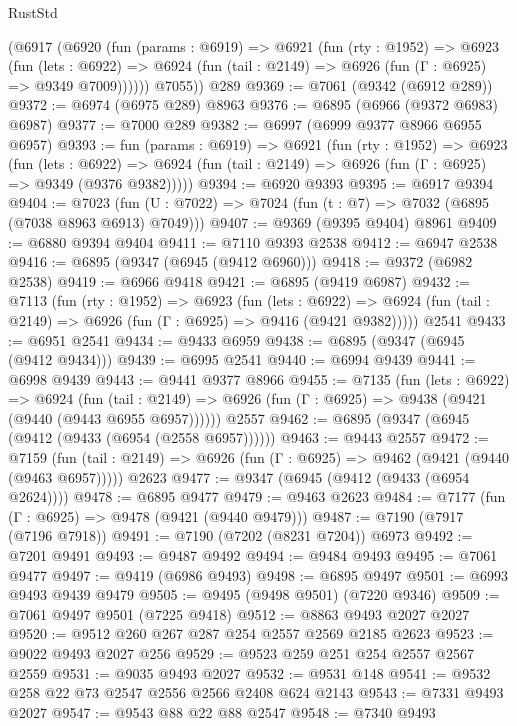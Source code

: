 \begin{lexlean}{RustStd}
\begin{coremodule}
      (@6917
        (@6920
          (fun (params : @6919) =>
          @6921
            (fun (rty : @1952) =>
            @6923
              (fun (lets : @6922) =>
              @6924 (fun (tail : @2149) => @6926 (fun (Γ : @6925) => @9349 @7009))))))
        @7055))
    @289
@9369 := @7061 (@9342 (@6912 @289))
@9372 := @6974 (@6975 @289) @8963
@9376 := @6895 (@6966 (@9372 @6983) @6987)
@9377 := @7000 @289
@9382 := @6997 (@6999 @9377 @8966 @6955 @6957)
@9393 := fun (params : @6919) =>
  @6921
    (fun (rty : @1952) =>
    @6923
      (fun (lets : @6922) =>
      @6924 (fun (tail : @2149) => @6926 (fun (Γ : @6925) => @9349 (@9376 @9382)))))
@9394 := @6920 @9393
@9395 := @6917 @9394
@9404 := @7023 (fun (U : @7022) => @7024 (fun (t : @7) => @7032 (@6895 (@7038 @8963 @6913) @7049)))
@9407 := @9369 (@9395 @9404) @8961
@9409 := @6880 @9394 @9404
@9411 := @7110 @9393 @2538
@9412 := @6947 @2538
@9416 := @6895 (@9347 (@6945 (@9412 @6960)))
@9418 := @9372 (@6982 @2538)
@9419 := @6966 @9418
@9421 := @6895 (@9419 @6987)
@9432 := @7113
    (fun (rty : @1952) =>
    @6923
      (fun (lets : @6922) =>
      @6924 (fun (tail : @2149) => @6926 (fun (Γ : @6925) => @9416 (@9421 @9382)))))
    @2541
@9433 := @6951 @2541
@9434 := @9433 @6959
@9438 := @6895 (@9347 (@6945 (@9412 @9434)))
@9439 := @6995 @2541
@9440 := @6994 @9439
@9441 := @6998 @9439
@9443 := @9441 @9377 @8966
@9455 := @7135
    (fun (lets : @6922) =>
    @6924
      (fun (tail : @2149) => @6926 (fun (Γ : @6925) => @9438 (@9421 (@9440 (@9443 @6955 @6957))))))
    @2557
@9462 := @6895 (@9347 (@6945 (@9412 (@9433 (@6954 (@2558 @6957))))))
@9463 := @9443 @2557
@9472 := @7159
    (fun (tail : @2149) => @6926 (fun (Γ : @6925) => @9462 (@9421 (@9440 (@9463 @6957)))))
    @2623
@9477 := @9347 (@6945 (@9412 (@9433 (@6954 @2624))))
@9478 := @6895 @9477
@9479 := @9463 @2623
@9484 := @7177 (fun (Γ : @6925) => @9478 (@9421 (@9440 @9479)))
@9487 := @7190 (@7917 (@7196 @7918))
@9491 := @7190 (@7202 (@8231 @7204)) @6973
@9492 := @7201 @9491
@9493 := @9487 @9492
@9494 := @9484 @9493
@9495 := @7061 @9477
@9497 := @9419 (@6986 @9493)
@9498 := @6895 @9497
@9501 := @6993 @9493 @9439 @9479
@9505 := @9495 (@9498 @9501) (@7220 @9346)
@9509 := @7061 @9497 @9501 (@7225 @9418)
@9512 := @8863 @9493 @2027 @2027
@9520 := @9512 @260 @267 @287 @254 @2557 @2569 @2185 @2623
@9523 := @9022 @9493 @2027 @256
@9529 := @9523 @259 @251 @254 @2557 @2567 @2559
@9531 := @9035 @9493 @2027
@9532 := @9531 @148
@9541 := @9532 @258 @22 @73 @2547 @2556 @2566 @2408 @624 @2143
@9543 := @7331 @9493 @2027
@9547 := @9543 @88 @22 @88 @2547
@9548 := @7340 @9493

\end{coremodule}
\end{lexlean}
